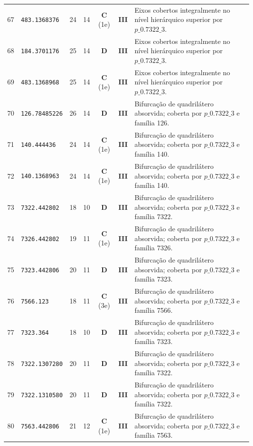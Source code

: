 \documentclass[11pt,a4paper]{article}
\begin{document}
\begin{small}
\begin{longtable}{r l c c c c p{8.8cm}}
67 & \texttt{483.1368376} & 24 & 14 & \textbf{C} (1e) & \textbf{III} & Eixos cobertos integralmente no nível hierárquico superior por $p\_0.7322\_3$. \\
68 & \texttt{184.3701176} & 25 & 14 & \textbf{D} & \textbf{III} & Eixos cobertos integralmente no nível hierárquico superior por $p\_0.7322\_3$. \\
69 & \texttt{483.1368968} & 25 & 14 & \textbf{C} (1e) & \textbf{III} & Eixos cobertos integralmente no nível hierárquico superior por $p\_0.7322\_3$. \\
70 & \texttt{126.78485226} & 26 & 14 & \textbf{D} & \textbf{III} & Bifurcação de quadrilátero absorvida; coberta por $p\_0.7322\_3$ e família 126. \\
71 & \texttt{140.444436} & 24 & 14 & \textbf{C} (1e) & \textbf{III} & Bifurcação de quadrilátero absorvida; coberta por $p\_0.7322\_3$ e família 140. \\
72 & \texttt{140.1368963} & 24 & 14 & \textbf{C} (1e) & \textbf{III} & Bifurcação de quadrilátero absorvida; coberta por $p\_0.7322\_3$ e família 140. \\
73 & \texttt{7322.442802} & 18 & 10 & \textbf{D} & \textbf{III} & Bifurcação de quadrilátero absorvida; coberta por $p\_0.7322\_3$ e família 7322. \\
74 & \texttt{7326.442802} & 19 & 11 & \textbf{C} (1e) & \textbf{III} & Bifurcação de quadrilátero absorvida; coberta por $p\_0.7322\_3$ e família 7326. \\
75 & \texttt{7323.442806} & 20 & 11 & \textbf{D} & \textbf{III} & Bifurcação de quadrilátero absorvida; coberta por $p\_0.7322\_3$ e família 7323. \\
76 & \texttt{7566.123} & 18 & 11 & \textbf{C} (3e) & \textbf{III} & Bifurcação de quadrilátero absorvida; coberta por $p\_0.7322\_3$ e família 7566. \\
77 & \texttt{7323.364} & 18 & 10 & \textbf{D} & \textbf{III} & Bifurcação de quadrilátero absorvida; coberta por $p\_0.7322\_3$ e família 7323. \\
78 & \texttt{7322.1307280} & 20 & 11 & \textbf{D} & \textbf{III} & Bifurcação de quadrilátero absorvida; coberta por $p\_0.7322\_3$ e família 7322. \\
79 & \texttt{7322.1310580} & 20 & 11 & \textbf{D} & \textbf{III} & Bifurcação de quadrilátero absorvida; coberta por $p\_0.7322\_3$ e família 7322. \\
80 & \texttt{7563.442806} & 21 & 12 & \textbf{C} (1e) & \textbf{III} & Bifurcação de quadrilátero absorvida; coberta por $p\_0.7322\_3$ e família 7563. \\

\end{longtable}
\end{small}
\end{document}
